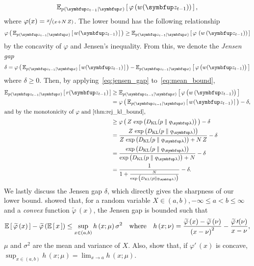 \begin{proofEnd}
\begin{equation}
    \Esub{p(\vz_{t-1}\mid\vx)}{ \varphi\left( w(\vz_{t-1}) \right)  },\label{eq:mean_bound}
  \end{equation}
  where \(\varphi(x) = \nicefrac{x}{(x + N\,Z)}\).
  The lower bound has the following relationship
  \begin{equation}
    \varphi\left(\,
    \Esub{p(\vz_{t-1}\mid\vx)}{ w(\vz_{t-1}) }
    \,\right)
    \geq
    \Esub{p(\vz_{t-1}\mid\vx)}{ \varphi\,\left( w\,(\vz_{t-1}) \right)  }
  \end{equation}
  by the concavity of \(\varphi\) and Jensen's inequality.
  From this, we denote the \textit{Jensen gap}
  \begin{equation}
    \delta = 
    \varphi\left(\,
    \Esub{p(\vz_{t-1}\mid\vx)}{ w(\vz_{t-1}) }
    \,\right)
    -
    \Esub{p(\vz_{t-1}\mid\vx)}{ \varphi\,\big( w(\vz_{t-1}) \big)  }\label{eq:jensen_gap}
  \end{equation}
  where \(\delta \geq 0\).
  Then, by applying~\eqref{eq:jensen_gap} to~\eqref{eq:mean_bound},
  \begin{align}
    \Esub{p(\vz_{t-1}\mid\vx)}{ r(\vz_{t-1}) }
    &\geq \Esub{p(\vz_{t-1}\mid\vx)}{ \varphi\,\big( w\,(\vz_{t-1}) \big)  } \\
    &= \varphi\left(\,
    \Esub{p(\vz_{t-1}\mid\vx)}{ w(\vz_{t-1}) }
    \,\right) - \delta, \\
\intertext{and by the monotonicity of \(\varphi\) and~\cref{thm:rej_kl_bound},}
    &\geq \varphi\left(\,
    Z\,\exp\big(\DKL{p}{q_{\vlambda}}\big)
    \,\right) - \delta \\
    &=
    \frac{
      Z\,\exp\big(\DKL{p}{q_{\vlambda}}\big)
    }{
      Z\,\exp\big(\DKL{p}{q_{\vlambda}}\big) + N\,Z
    } - \delta \\
    &= \frac{
      \exp\big(\DKL{p}{q_{\vlambda}}\big)
    }{
      \exp\big(\DKL{p}{q_{\vlambda}}\big) + N
    } - \delta \\
    &= \frac{1}{
       1 + \frac{N}{
         \exp\big(\DKL{p}{q_{\vlambda}}\big) 
      }
    } - \delta.
  \end{align}
  We lastly discuss the Jensen gap \(\delta\), which directly gives the sharpness of our lower bound.
  \citet[Theorem 1]{liao_sharpening_2019} showed that, for a random variable \(X \in (a, b), -\infty \leq a < b \leq \infty\) and a \textit{convex} function \(\widetilde{\varphi}\,(x)\), the Jensen gap is bounded such that
  \begin{align}
    \mathbb{E}\left[\,\widetilde{\varphi}\,(x)\,\right] - \widetilde{\varphi}\,(\mathbb{E}\left[\,x\,\right])
    \leq
    \sup_{x \in (a,b)} h\,(x; \mu) \, \sigma^2
    \quad \text{where}\quad h\,(x; \nu) = \frac{\widetilde{\varphi}\,(x) - \widetilde{\varphi}\,(\nu)}{{(x - \nu)}^2} - \frac{ \widetilde{\varphi}\,\prime(\nu) }{ x - \nu },
  \end{align}
\(\mu\) and \(\sigma^2\) are the mean and variance of \(X\).
Also, \citet[Lemma 1]{liao_sharpening_2019} show that, if \(\varphi\prime\,(x)\) is concave,  \(\sup_{x \in (a,b)} h\,(x; \mu) = \lim_{x \rightarrow a} h\,(x; \mu) \). 


\end{proofEnd}
